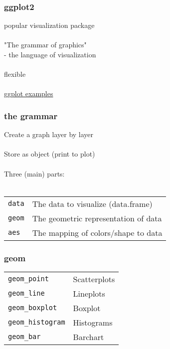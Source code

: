 \documentclass{beamer}
\begin{document}
\begin{frame}
	\frametitle{ggplot2}
	\begin{center}
		popular visualization package \\~\\
		
		"The grammar of graphics" \\
		- the language of visualization \\~\\
		
		flexible \\~\\
		
		\href{http://shiny.stat.ubc.ca/r-graph-catalog/}{ggplot examples}
	\end{center}
\end{frame}

\begin{frame}
	\frametitle{the grammar}
	\begin{center}
		Create a graph layer by layer \\~\\
		
		Store as object (print to plot) \\~\\
		
		Three (main) parts: \\~\\
		
	\begin{table}
		\begin{tabular}{l l}
			\texttt{data} & The data to visualize (data.frame) \\
			\texttt{geom} & The geometric representation of data \\
			\texttt{aes} & The mapping of colors/shape to data \\
		\end{tabular}
	\end{table}
	\end{center}
\end{frame}

\begin{frame}
	\frametitle{geom}
	\begin{center}
		\begin{table}
			\begin{tabular}{l l}
				\texttt{geom\_point} & Scatterplots \\
				\texttt{geom\_line} & Lineplots \\
				\texttt{geom\_boxplot} & Boxplot \\
				\texttt{geom\_histogram} & Histograms \\
				\texttt{geom\_bar} & Barchart \\
			\end{tabular}
		\end{table}
	\end{center}
\end{frame}
\end{document}
